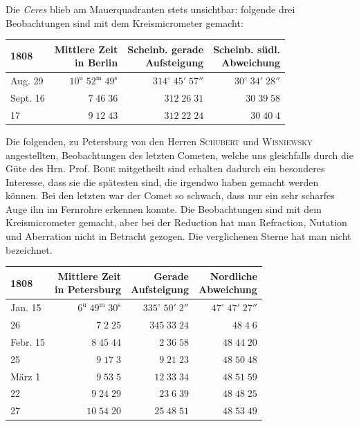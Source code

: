 \par\indent Die \emph{Ceres} blieb am Mauerquadranten stets unsichtbar: folgende drei Beobachtungen sind mit dem
Kreismicrometer gemacht:


\begin{center}\fontsize{10}{12}\selectfont\setlength{\tabcolsep}{5pt}\renewcommand{\arraystretch}{1.15}\begin{tabular}{lrrr}
1808 & \shortstack{Mittlere Zeit\\in Berlin} & \shortstack{Scheinb. gerade\\Aufsteigung} & \shortstack{Scheinb. südl.\\Abweichung}\\
\hline
Aug. 29 & $10^{\text{u}}\;52^{\text{m}}\;49^{\text{s}}$ & $314^\circ\;45'\;57''$ & $30^\circ\;34'\;28''$\\
Sept. 16 & $7\;46\;36$ & $312\;26\;31$ & $30\;39\;58$\\
17 & $9\;12\;43$ & $312\;22\;24$ & $30\;40\;4$\\
\end{tabular}\end{center}


\par\indent Die folgenden, zu Petersburg von den Herren \textsc{Schubert} und \textsc{Wisniewsky} angestellten, Beobachtungen des letzten Cometen, welche uns gleichfalls durch die Güte des Hrn. Prof. \textsc{Bode} mitgetheilt sind
erhalten dadurch ein besonderes Interesse, dass sie die spätesten sind, die irgendwo haben gemacht werden können. Bei den letzten war der Comet so schwach, dass nur ein sehr scharfes Auge ihn im Fernrohre erkennen konnte. Die Beobachtungen sind mit dem Kreismicrometer gemacht, aber bei der Reduction hat man Refraction, Nutation und Aberration nicht in Betracht gezogen. Die verglichenen
Sterne hat man nicht bezeichnet.


\begin{center}\fontsize{10}{12}\selectfont\setlength{\tabcolsep}{5pt}\renewcommand{\arraystretch}{1.15}\begin{tabular}{lrrr}
1808 & \shortstack{Mittlere Zeit\\in Petersburg} & \shortstack{Gerade\\Aufsteigung} & \shortstack{Nordliche\\Abweichung}\\
\hline
Jan. 15 & $6^{\text{u}}\;49^{\text{m}}\;30^{\text{s}}$ & $335^\circ\;50'\;2''$ & $47^\circ\;47'\;27''$\\
26 & $7\;2\;25$ & $345\;33\;24$ & $48\;4\;6$\\
Febr. 15 & $8\;45\;44$ & $2\;36\;58$ & $48\;44\;20$\\
25 & $9\;17\;3$ & $9\;21\;23$ & $48\;50\;48$\\
März 1 & $9\;53\;5$ & $12\;33\;34$ & $48\;51\;59$\\
22 & $9\;24\;29$ & $23\;6\;39$ & $48\;48\;25$\\
27 & $10\;54\;20$ & $25\;48\;51$ & $48\;53\;49$\\
\end{tabular}\end{center}


